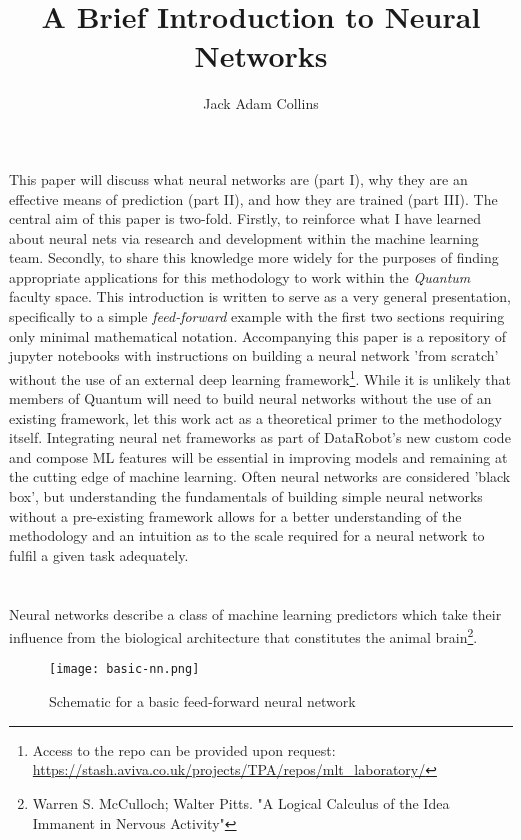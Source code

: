 \documentclass[11pt]{article}
\title{A Brief Introduction to Neural Networks}
\author{Jack Adam Collins}
\date{}
\begin{document}
\maketitle

This paper will discuss what neural networks are (part I), why they are an effective means of prediction (part II), and how they are trained (part III). The central aim of this paper is two-fold. Firstly, to reinforce what I have learned about neural nets via research and development within the machine learning team. Secondly, to share this knowledge more widely for the purposes of finding appropriate applications for this methodology to work within the \textit{Quantum} faculty space. This introduction is written to serve as a very general presentation, specifically to a simple \textit{feed-forward} example with the first two sections requiring only minimal mathematical notation. Accompanying this paper is a repository of jupyter notebooks with instructions on building a neural network 'from scratch' without the use of an external deep learning framework\footnote{Access to the repo can be provided upon request: \url{https://stash.aviva.co.uk/projects/TPA/repos/mlt_laboratory/}}. While it is unlikely that members of Quantum will need to build neural networks without the use of an existing framework, let this work act as a theoretical primer to the methodology itself. Integrating neural net frameworks as part of DataRobot's new custom code and compose ML features will be essential in improving models and remaining at the cutting edge of machine learning. Often neural networks are considered 'black box', but understanding the fundamentals of building simple neural networks without a pre-existing framework allows for a better understanding of the methodology and an intuition as to the scale required for a neural network to fulfil a given task adequately.
\section{}


Neural networks describe a class of machine learning predictors which take their influence from the biological architecture that constitutes the animal brain\footnote{Warren S. McCulloch; Walter Pitts. "A Logical Calculus of the Idea Immanent in Nervous Activity"}. 

\begin{figure}[h]
    \centering
    \texttt{[image: basic-nn.png]}
    \caption{Schematic for a basic feed-forward neural network}   
\end{figure}
\end{document}
